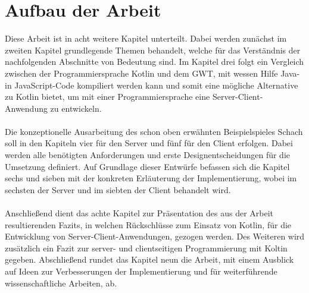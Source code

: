 \section{Aufbau der Arbeit}
Diese Arbeit ist in acht weitere Kapitel unterteilt. Dabei werden zunächst im zweiten Kapitel grundlegende Themen behandelt, welche für das Verständnis der nachfolgenden Abschnitte von Bedeutung sind. Im Kapitel drei folgt ein Vergleich zwischen der Programmiersprache Kotlin und dem \gls{GWT}, mit wessen Hilfe Java- in JavaScript-Code kompiliert werden kann und somit eine mögliche Alternative zu Kotlin bietet, um mit einer Programmiersprache eine Server-Client-Anwendung zu entwickeln.\\
\\
Die konzeptionelle Ausarbeitung des schon oben erwähnten Beispielspieles Schach soll in den Kapiteln vier für den Server und fünf für den Client erfolgen. Dabei werden alle benötigten Anforderungen und erste Designentscheidungen für die Umsetzung definiert. Auf Grundlage dieser Entwürfe befassen sich die Kapitel sechs und sieben mit der konkreten Erläuterung der Implementierung, wobei im sechsten der Server und im siebten der Client behandelt wird.\\
\\
Anschließend dient das achte Kapitel zur Präsentation des aus der Arbeit resultierenden Fazits, in welchen Rückschlüsse zum Einsatz von Kotlin, für die Entwicklung von Server-Client-Anwendungen, gezogen werden. Des Weiteren wird zusätzlich ein Fazit zur server- und clientseitigen Programmierung mit Koltin gegeben.
Abschließend rundet das Kapitel neun die Arbeit, mit einem Ausblick auf Ideen zur Verbesserungen der Implementierung und für weiterführende wissenschaftliche Arbeiten, ab.
